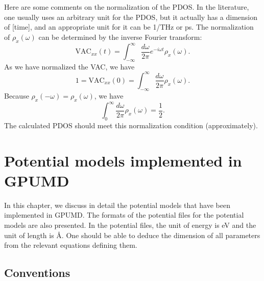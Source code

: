 \documentclass[12pt,a4paper]{report}
\begin{document}
Here are some comments on the normalization of the PDOS. In the literature, one usually uses an arbitrary unit for the PDOS, but it actually has a dimension of [time], and an appropriate unit for it can be 1/THz or ps. The normalization of $\rho_x(\omega)$ can be determined by the inverse Fourier transform:
\begin{equation}
\text{VAC}_{xx}(t)
 = \int_{-\infty}^{\infty} \frac{d\omega}{2\pi} e^{-i\omega t}\rho_x(\omega).
\end{equation}
As we have normalized the VAC, we have
\begin{equation}
1 = \text{VAC}_{xx}(0)
 = \int_{-\infty}^{\infty}
 \frac{d\omega}{2\pi}\rho_x(\omega).
\end{equation}
Because $\rho_x(-\omega)=\rho_x(\omega)$, we have
\begin{equation}
\int_{0}^{\infty}
 \frac{d\omega}{2\pi}\rho_x(\omega) = \frac{1}{2}.
\end{equation}
The calculated PDOS should meet this normalization condition (approximately).


\chapter{Potential models implemented in GPUMD\label{chapter:potentials}}


In this chapter, we discuss in detail the potential models that have been implemented in GPUMD.
The formats of the potential files for the potential models are also presented. In the potential files, the unit of energy is eV and the unit of length is \AA. One should be able to deduce the dimension of all parameters from the relevant equations defining them.

\section{Conventions}
\end{document}
